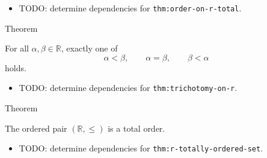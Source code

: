 \begin{dependencies}
\begin{itemize}
  \item TODO: determine dependencies for \texttt{thm:order-on-r-total}.
\end{itemize}
\end{dependencies}

\begin{theorembox}{Theorem}
\begin{theorem}
\label{thm:trichotomy-on-r}
For all $\alpha,\beta\in\mathbb{R}$, exactly one of
\[
\alpha<\beta,\qquad \alpha=\beta,\qquad \beta<\alpha
\]
holds.
\end{theorem}
\end{theorembox}

\begin{dependencies}
\begin{itemize}
  \item TODO: determine dependencies for \texttt{thm:trichotomy-on-r}.
\end{itemize}
\end{dependencies}

\begin{theorembox}{Theorem}
\begin{theorem}
\label{thm:r-totally-ordered-set}
The ordered pair $(\mathbb{R},\le)$ is a total order.
\end{theorem}
\end{theorembox}

\begin{dependencies}
\begin{itemize}
  \item TODO: determine dependencies for \texttt{thm:r-totally-ordered-set}.
\end{itemize}
\end{dependencies}

